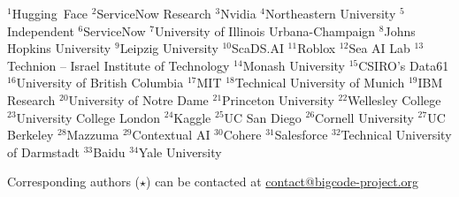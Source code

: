 \begin{center}
$^{1}$Hugging~Face \quad
$^{2}$ServiceNow Research\quad
$^{3}$Nvidia\quad
$^{4}$Northeastern University\quad
$^{5}$Independent\quad
$^{6}$ServiceNow\quad
$^{7}$University of Illinois Urbana-Champaign\quad
$^{8}$Johns Hopkins University\quad
$^{9}$Leipzig University\quad
$^{10}$ScaDS.AI\quad
$^{11}$Roblox\quad
$^{12}$Sea AI Lab\quad
$^{13}$Technion -- Israel Institute of Technology\quad
$^{14}$Monash University\quad
$^{15}$CSIRO's Data61\quad
$^{16}$University of British Columbia\quad
$^{17}$MIT\quad
$^{18}$Technical University of Munich\quad
$^{19}$IBM Research\quad
$^{20}$University of Notre Dame\quad
$^{21}$Princeton University\quad
$^{22}$Wellesley College\quad
$^{23}$University College London\quad
$^{24}$Kaggle\quad
$^{25}$UC San Diego\quad
$^{26}$Cornell University\quad
$^{27}$UC Berkeley\quad
$^{28}$Mazzuma\quad
$^{29}$Contextual AI\quad
$^{30}$Cohere\quad
$^{31}$Salesforce\quad
$^{32}$Technical University of Darmstadt\quad
$^{33}$Baidu\quad
$^{34}$Yale University\quad


Corresponding authors ($\star$) can be contacted at \href{contact@bigcode-project.org}{contact@bigcode-project.org}\\
\vspace{0.5cm}
\end{center}
